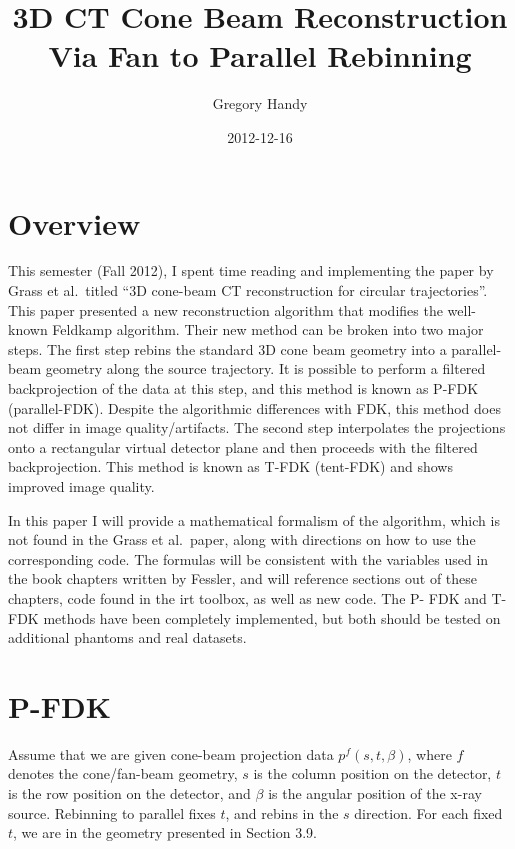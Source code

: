 \documentclass[12pt]{article}
\title{3D CT Cone Beam Reconstruction Via Fan to Parallel Rebinning}
\author{Gregory Handy}
\date{2012-12-16}
\begin{document}
\maketitle

\section{Overview}

This semester (Fall 2012), I spent time reading and implementing the paper by
Grass et al.\ titled ``3D cone-beam CT reconstruction for circular
trajectories''. This paper presented a new reconstruction algorithm that
modifies the well-known Feldkamp algorithm.  Their new method can be broken
into two major steps.  The first step rebins the standard 3D cone beam
geometry into a parallel-beam geometry along the source trajectory.  It is
possible to perform a filtered backprojection of the data at this step, and
this method is known as P-FDK (parallel-FDK). Despite the algorithmic
differences with FDK, this method does not differ in image quality/artifacts.
The second step interpolates the projections onto a rectangular virtual
detector plane and then proceeds with the filtered backprojection.  This
method is known as T-FDK (tent-FDK) and shows improved image quality.

In this paper I will provide a mathematical formalism of the algorithm, which
is not found in the Grass et al.\ paper, along with directions on how to use
the corresponding code.  The formulas will be consistent with the variables
used in the book chapters written by Fessler, and will reference sections out
of these chapters, code found in the irt toolbox, as well as new code.  The P-
FDK and T-FDK methods have been completely implemented, but both should be
tested on additional phantoms and real datasets.



\section{P-FDK}

Assume that we are given cone-beam projection data $p^f(s,t,\beta)$, where $f$
denotes the cone/fan-beam geometry, $s$ is the column position on the
detector, $t$ is the row position on the detector, and $\beta$ is the angular
position of the x-ray source.  Rebinning to parallel fixes $t$, and rebins in
the $s$ direction.  For each fixed $t$, we are in the geometry presented in
Section 3.9.
\end{document}
